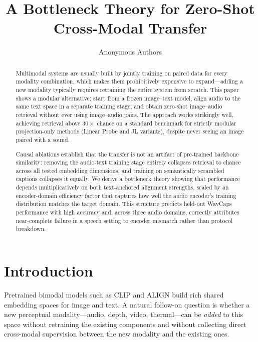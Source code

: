 \documentclass{article}
\title{A Bottleneck Theory for Zero-Shot Cross-Modal Transfer}
\author{%
  Anonymous Authors
}
\begin{document}
\maketitle

\begin{abstract}
Multimodal systems are usually built by jointly training on paired data for every modality combination, which makes them prohibitively expensive to expand---adding a new modality typically requires retraining the entire system from scratch.
This paper shows a modular alternative: start from a frozen image--text model, align audio to the same text space in a separate training stage, and obtain zero-shot image--audio retrieval without ever using image--audio pairs.
The approach works strikingly well, achieving retrieval above $30\times$ chance on a standard benchmark for strictly modular projection-only methods (Linear Probe and JL variants), despite never seeing an image paired with a sound.

Causal ablations establish that the transfer is not an artifact of pre-trained backbone similarity: removing the audio-text training stage entirely collapses retrieval to chance across all tested embedding dimensions, and training on semantically scrambled captions collapses it equally.
We derive a bottleneck theory showing that performance depends multiplicatively on both text-anchored alignment strengths, scaled by an encoder-domain efficiency factor that captures how well the audio encoder's training distribution matches the target domain.
This structure predicts held-out WavCaps performance with high accuracy and, across three audio domains, correctly attributes near-complete failure in a speech setting to encoder mismatch rather than protocol breakdown.
\end{abstract}


\section{Introduction}

Pretrained bimodal models such as CLIP \citep{radford2021clip} and ALIGN \citep{jia2021align} build rich shared embedding spaces for image and text.
A natural follow-on question is whether a new perceptual modality---audio, depth, video, thermal---can be \emph{added} to this space without retraining the existing components and without collecting direct cross-modal supervision between the new modality and the existing ones.
\end{document}
